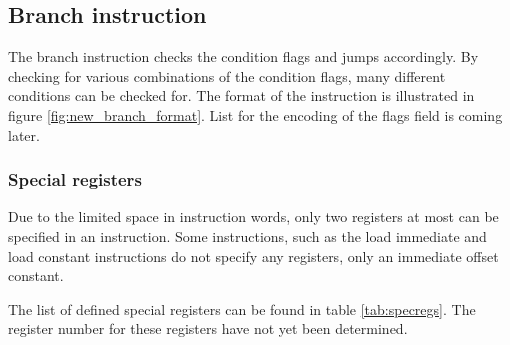 \subsection{Branch instruction}
The branch instruction checks the condition flags and jumps accordingly. By
checking for various combinations of the condition flags, many different
conditions can be checked for. The format of the instruction is illustrated
in figure \ref{fig:new_branch_format}. List for the encoding of the flags field
is coming later.



\subsubsection{Special registers}

Due to the limited space in instruction words, only two registers at most can be
specified in an instruction. Some instructions, such as the load immediate and
load constant instructions do not specify any registers, only an immediate
offset constant.

The list of defined special registers can be found in table \ref{tab:specregs}.
The register number for these registers have not yet been determined.



